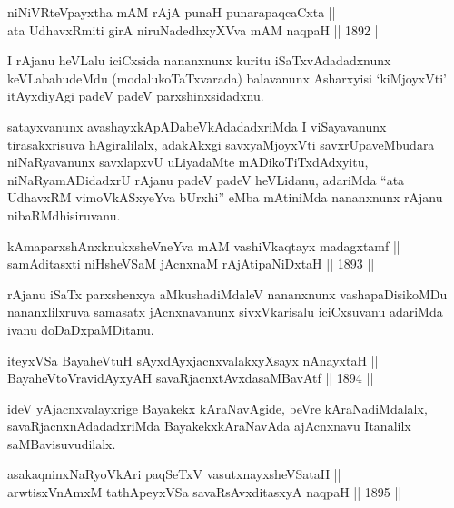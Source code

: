 \begin{shl}
niNiVRteV\s payxtha mAM rAjA punaH punarapaqcaCxta || \\
ata UdhavxRmiti girA niruNadedhxyXVva mAM naqpaH ||  1892 ||  
\end{shl}

\begin{artha}
I rAjanu heVLalu iciCxsida nananxnunx kuritu iSaTxvAdadadxnunx
keVLabahudeMdu (modalukoTaTxvarada) balavanunx Asharxyisi `kiMjoyxVti'
itAyxdiyAgi padeV padeV parxshinxsidadxnu.
\end{artha}

\begin{artha}
satayxvanunx avashayxkApADabeVkAdadadxriMda I viSayavanunx
tirasakxrisuva hAgiralilalx, adakAkxgi savxyaMjoyxVti
savxrUpaveMbudara niNaRyavanunx savxlapxvU uLiyadaMte
mADikoTiTxdAdxyitu, niNaRyamADidadxrU rAjanu padeV padeV heVLidanu,
adariMda ``ata UdhavxRM vimoVkASxyeYva bUrxhi'' eMba mAtiniMda nananxnunx rAjanu nibaRMdhisiruvanu.
\end{artha}

\begin{shl}
kAmaparxshAnxknukxsheVneYva mAM vashiVkaqtayx madagxtamf || \\
samAditasxti niHsheVSaM jAcnxnaM rAjA\s tipaNiDxtaH ||  1893 ||  
\end{shl}

\begin{artha}
rAjanu iSaTx parxshenxya aMkushadiMdaleV nananxnunx vashapaDisikoMDu
nananxlilxruva samasatx jAcnxnavanunx sivxVkarisalu iciCxsuvanu
adariMda ivanu doDaDxpaMDitanu.
\end{artha}

\begin{shl}
iteyxVSa BayaheVtuH sAyxdAyxjacnxvalakxyXsayx nAnayxtaH || \\
BayaheVtoVravidAyxyAH savaRjacnxtAvxdasaMBavAtf ||  1894 ||  
\end{shl}

\begin{artha}
ideV yAjacnxvalayxrige Bayakekx kAraNavAgide, beVre kAraNadiMdalalx,
savaRjacnxnAdadadxriMda BayakekxkAraNavAda ajAcnxnavu Itanalilx
saMBavisuvudilalx.
\end{artha}

\begin{shl}
asakaqninxNaRyoV\s kAri paqSeTxV vasutxnayxsheVSataH || \\
arwtisxVnAmxM tathA\s peyxVSa savaRsAvxditasxyA naqpaH ||  1895 ||  
\end{shl}

